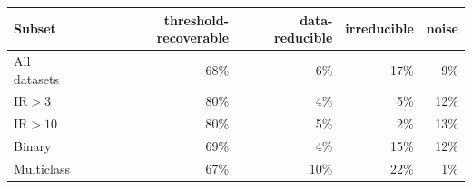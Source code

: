 \begin{tabular}{lrrrr}
\toprule
Subset & threshold-recoverable & data-reducible & irreducible & noise \\
\midrule
All datasets & 68\% & 6\% & 17\% & 9\% \\
$\mathrm{IR}>3$ & 80\% & 4\% & 5\% & 12\% \\
$\mathrm{IR}>10$ & 80\% & 5\% & 2\% & 13\% \\
Binary & 69\% & 4\% & 15\% & 12\% \\
Multiclass & 67\% & 10\% & 22\% & 1\% \\
\bottomrule
\end{tabular}
